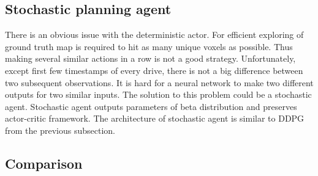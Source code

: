 \subsection{Stochastic planning agent}
There is an obvious issue with the deterministic actor. For efficient exploring of ground truth map is required to hit as many unique voxels as possible. Thus making several similar actions in a row is not a good strategy. Unfortunately, except first few timestamps of every drive, there is not a big difference between two subsequent observations. It is hard for a neural network to make two different outputs for two similar inputs. The solution to this problem could be a stochastic agent. Stochastic agent outputs parameters of beta distribution and preserves actor-critic framework. The architecture of stochastic agent is similar to DDPG from the previous subsection. 

\subsection{Comparison}
